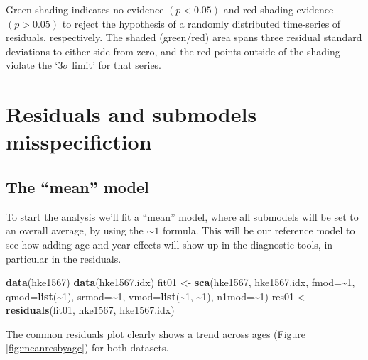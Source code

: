 \documentclass[
]{book}
\newenvironment{Shaded}{\begin{snugshade}}{\end{snugshade}}
\newcommand{\AttributeTok}[1]{\textcolor[rgb]{0.13,0.29,0.53}{#1}}
\newcommand{\DecValTok}[1]{\textcolor[rgb]{0.00,0.00,0.81}{#1}}
\newcommand{\FunctionTok}[1]{\textcolor[rgb]{0.13,0.29,0.53}{\textbf{#1}}}
\newcommand{\NormalTok}[1]{#1}
\newcommand{\OtherTok}[1]{\textcolor[rgb]{0.56,0.35,0.01}{#1}}
\newcommand{\SpecialCharTok}[1]{\textcolor[rgb]{0.81,0.36,0.00}{\textbf{#1}}}
\begin{document}
Green shading indicates no evidence \((p < 0.05)\) and red shading evidence \((p >0.05)\) to reject the hypothesis of a randomly distributed time-series of residuals, respectively. The shaded (green/red) area spans three residual standard deviations to either side from zero, and the red points outside of the shading violate the `\(3\sigma\) limit' for that series.

\hypertarget{residuals-and-submodels-misspecifiction}{%
\section{Residuals and submodels misspecifiction}\label{residuals-and-submodels-misspecifiction}}

\hypertarget{the-mean-model}{%
\subsection{The ``mean'' model}\label{the-mean-model}}

To start the analysis we'll fit a ``mean'' model, where all submodels will be set to an overall average, by using the \(\sim 1\) formula. This will be our reference model to see how adding age and year effects will show up in the diagnostic tools, in particular in the residuals.

\begin{Shaded}
\begin{Highlighting}[]
\FunctionTok{data}\NormalTok{(hke1567)}
\FunctionTok{data}\NormalTok{(hke1567.idx)}
\NormalTok{fit01 }\OtherTok{\textless{}{-}} \FunctionTok{sca}\NormalTok{(hke1567, hke1567.idx, }\AttributeTok{fmod=}\SpecialCharTok{\textasciitilde{}}\DecValTok{1}\NormalTok{, }\AttributeTok{qmod=}\FunctionTok{list}\NormalTok{(}\SpecialCharTok{\textasciitilde{}}\DecValTok{1}\NormalTok{), }\AttributeTok{srmod=}\SpecialCharTok{\textasciitilde{}}\DecValTok{1}\NormalTok{, }\AttributeTok{vmod=}\FunctionTok{list}\NormalTok{(}\SpecialCharTok{\textasciitilde{}}\DecValTok{1}\NormalTok{, }\SpecialCharTok{\textasciitilde{}}\DecValTok{1}\NormalTok{),  }\AttributeTok{n1mod=}\SpecialCharTok{\textasciitilde{}}\DecValTok{1}\NormalTok{)}
\NormalTok{res01 }\OtherTok{\textless{}{-}} \FunctionTok{residuals}\NormalTok{(fit01, hke1567, hke1567.idx)}
\end{Highlighting}
\end{Shaded}

The common residuals plot clearly shows a trend across ages (Figure \ref{fig:meanresbyage}) for both datasets.
\end{document}
